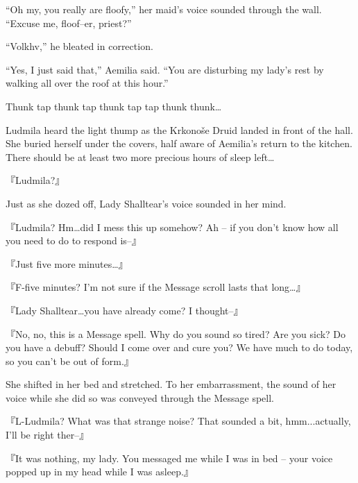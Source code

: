  

“Oh my, you really are floofy,” her maid’s voice sounded through the wall. “Excuse me, floof–er, priest?”

 

“Volkhv,” he bleated in correction.

 

“Yes, I just said that,” Aemilia said. “You are disturbing my lady’s rest by walking all over the roof at this hour.”

 

Thunk tap thunk tap thunk tap tap thunk thunk…

 

Ludmila heard the light thump as the Krkonoše Druid landed in front of the hall. She buried herself under the covers, half aware of Aemilia’s return to the kitchen. There should be at least two more precious hours of sleep left…

 

『Ludmila?』

 

Just as she dozed off, Lady Shalltear’s voice sounded in her mind.

 

『Ludmila? Hm…did I mess this up somehow? Ah – if you don’t know how all you need to do to respond is–』

 

『Just five more minutes…』

 

『F-five minutes? I’m not sure if the Message scroll lasts that long…』

 

『Lady Shalltear…you have already come? I thought–』

 

『No, no, this is a Message spell. Why do you sound so tired? Are you sick? Do you have a debuff? Should I come over and cure you? We have much to do today, so you can’t be out of form.』

 

She shifted in her bed and stretched. To her embarrassment, the sound of her voice while she did so was conveyed through the Message spell.

 

『L-Ludmila? What was that strange noise? That sounded a bit, hmm...actually, I’ll be right ther–』

 

『It was nothing, my lady. You messaged me while I was in bed – your voice popped up in my head while I was asleep.』

